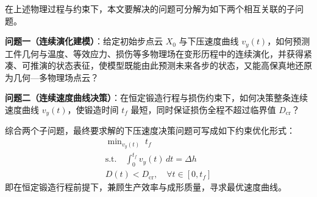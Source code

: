 在上述物理过程与约束下，本文要解决的问题可分解为如下两个相互关联的子问题。

\textbf{问题一（连续演化建模）}：给定初始步点云 $X_0$ 与下压速度曲线 $v_y(t)$，如何预测工件几何与温度、等效应力、损伤等多物理场在变形历程中的连续演化，并获得紧凑、可推演的状态表征，使模型既能由此预测未来各步的状态，又能高保真地还原为几何—多物理场点云？
    
\textbf{问题二（连续速度曲线决策）}：在恒定锻造行程与损伤约束下，如何决策整条连续速度曲线 $v_y(t)$，使锻造时间 $t_f$ 最短，同时保证损伤全程不超过临界值 $D_{\text{cr}}$？

综合两个子问题，最终要求解的下压速度决策问题可写成如下约束优化形式：
\begin{equation}
\begin{gathered}
\min\nolimits_{v_y(t)} \; t_f \\
\text{s.t.} \quad \int_{0}^{t_f} v_y(t)\,dt = \Delta h \\
D(t) < D_{\text{cr}}, \quad \forall t \in [0, t_f]
\end{gathered}
\label{equ:model}
\end{equation}
即在恒定锻造行程前提下，兼顾生产效率与成形质量，寻求最优速度曲线。
